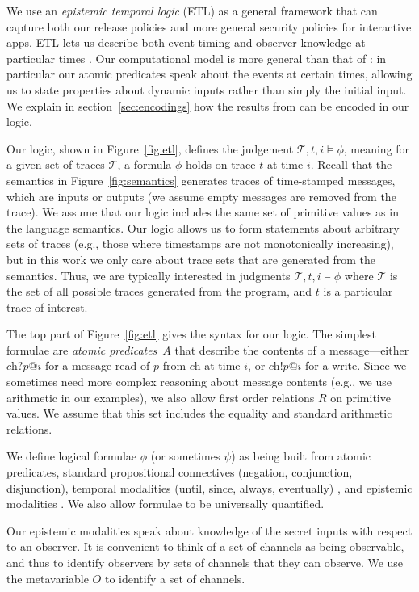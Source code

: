 \documentclass[conference]{IEEEtran}
\theoremstyle{definition}
\newcommand{\sch}{\textit{ch}}
\newcommand{\prin}{\textit{O}}
\newcommand{\atom}{A}
\newcommand{\tr}{t\xspace}
\newcommand{\tset}{\ensuremath{\mathcal{T}}\xspace}
\newcommand{\comment}[3][\color{red}]{{#1{[{#2}: {#3}]}}}
\newcommand{\kris}[1]{\comment[\color{orange}]{kris}{#1}}
\begin{document}
We use an \emph{epistemic temporal logic} (ETL) as a general framework
that can capture both our release policies and more general security
policies for interactive apps. ETL lets us describe both event timing
and observer knowledge at particular times \cite{Balliu:11}. Our
computational model is more general than that of \cite{Balliu:11}: in
particular our atomic predicates speak about the events at certain
times, allowing us to state properties about dynamic inputs
rather than simply the initial input.  We explain in
section~\ref{sec:encodings} how the results from \cite{Balliu:11} can
be encoded in our logic.

Our logic, shown in Figure~\ref{fig:etl}, defines the judgement
$\tset, \tr, i \models \phi$, meaning for a given set of traces
$\tset$, a formula $\phi$ holds on trace $\tr$ at time $i$.  Recall
that the semantics in Figure~\ref{fig:semantics} generates traces of
time-stamped messages, which are inputs or outputs (we assume empty
messages are removed from the trace). We assume that our logic
includes the same set of primitive values as in the language
semantics.
Our logic allows us to form statements about arbitrary sets of traces
(e.g., those where timestamps are not monotonically increasing), but
in this work we only care about trace sets that are generated from the
semantics.
Thus, we are typically interested in judgments $\tset, \tr, i \models
\phi$ where $\tset$ is the set of all possible traces generated from
the program, and $\tr$ is a particular trace of interest.

The top part of Figure~\ref{fig:etl} gives the syntax for our
logic. The simplest formulae are \emph{atomic predicates}~$\atom$ that
describe the contents of a message---either $\sch?p@i$ for a message
read of $p$ from $\sch$ at time $i$, or $\sch!p@i$ for a write. Since
we sometimes need more complex reasoning about message contents (e.g.,
we use arithmetic in our examples), we also allow first order
relations $R$ on primitive values.  We assume that this set includes
the equality and standard arithmetic relations.

We define logical formulae $\phi$ (or sometimes $\psi$) as being built
from atomic predicates, standard propositional connectives (negation,
conjunction, disjunction), temporal modalities (until, since, always,
eventually) \cite{Pnueli:1977} \cite{Gabbay:1980}, and epistemic
modalities \kris{maybe cite?}.  We also allow formulae to be
universally quantified.

Our epistemic modalities speak about knowledge of the secret inputs
with respect to an observer.  It is convenient to think of a set of
channels as being observable, and thus to identify observers by sets
of channels that they can observe.  We use the metavariable $\prin$ to
identify a set of channels.
\end{document}
